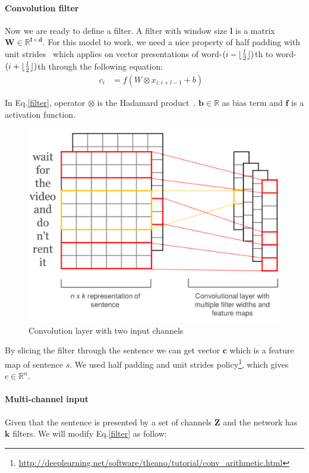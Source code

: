 \paragraph{Convolution filter}
Now we are ready to define a filter.
A filter with window size \(\bm{l}\) is a matrix \(\bm{W \in \mathbb{R}^{l \times d}}\).
For this model to work, we need a nice property of half padding with unit strides~\cite{conv-arith}
 which applies on vector presentations of word-\((i-\lfloor \frac{l}{2} \rfloor)\)th to word-\((i+\lfloor \frac{l}{2} \rfloor)\)th through the following equation:
\begin{align}
    c_i &= f(W \otimes x_{i:i+l-1} + b) &\label{filter}
\end{align}

In Eq.\eqref{filter}, operator \(\otimes\) is the Hadamard product~\cite{element-prod}.  
\(\bm{b \in \mathbb{R}}\) as bias term and \(\bm{f}\) is a activation function.

\begin{figure}[H]
    \centering
    \includegraphics[scale=0.3]{figure/cnn-module}
    \caption[Convolution layer with two input channels]{Convolution layer with two input channels}
    \label{fig:cnn-module}
\end{figure}

By slicing the filter through the sentence we can get vector \(\bm{c}\) which is a feature map of sentence \(s\).
We used half padding and unit strides policy\footnote{\url{http://deeplearning.net/software/theano/tutorial/conv_arithmetic.html}}, which gives \(c \in \mathbb{R}^{n}\).

\paragraph{Multi-channel input} Given that the sentence is presented by a set of channels \(\bm{Z}\) and the network has \(\bm{k}\) filters.
We will modify Eq.\eqref{filter} as follow:

